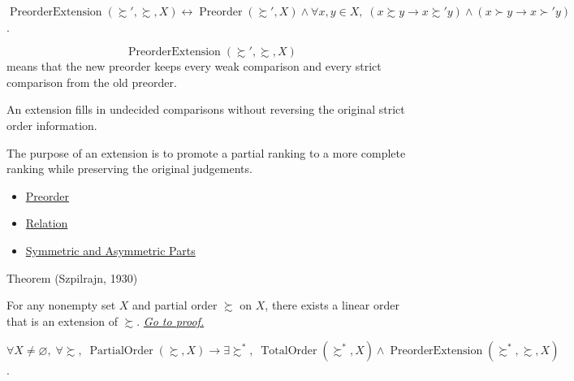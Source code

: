 \begin{remark*}
$\operatorname{PreorderExtension}(\succsim',\succsim,X)\leftrightarrow
\operatorname{Preorder}(\succsim',X)\wedge
\forall x,y\in X,\; (x\succsim y\to x\succsim' y)\wedge
(x\succ y\to x\succ' y)$.
\end{remark*}

\begin{remark*}
\[
  \operatorname{PreorderExtension}(\succsim',\succsim,X)
\] means that the new
preorder keeps every weak comparison and every strict comparison from the old
preorder.
\end{remark*}

\begin{remark*}[Interpretation]
An extension fills in undecided comparisons without reversing the original
strict order information.
\end{remark*}

\begin{remark*}[Exposition]
The purpose of an extension is to promote a partial ranking to a more complete
ranking while preserving the original judgements.
\end{remark*}

\begin{dependencies}
\begin{itemize}
  \item \hyperref[def:preorder]{Preorder}
  \item \hyperref[def:relation]{Relation}
  \item \hyperref[def:sym-asym]{Symmetric and Asymmetric Parts}
\end{itemize}
\end{dependencies}


\begin{theorembox}{Theorem (Szpilrajn, 1930)}
\begin{theorem}\label{thm:szpilrajn}
For any nonempty set $X$ and partial order $\succsim$ on $X$, there exists a
linear order that is an extension of $\succsim$.
\hyperref[prf:szpilrajn]{\textit{Go to proof.}}
\end{theorem}
\end{theorembox}

\begin{remark*}
$\forall X\neq\varnothing,\;\forall \succsim,\;
\operatorname{PartialOrder}(\succsim,X)\to
\exists \succsim^*,\; \operatorname{TotalOrder}(\succsim^*,X)\wedge
\operatorname{PreorderExtension}(\succsim^*,\succsim,X)$.
\end{remark*}


